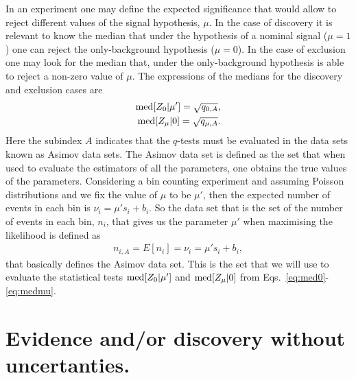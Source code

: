 \documentclass[12pt,a4paper]{article}
\begin{document}
In an experiment one may define the expected significance that would allow to reject different values of the signal hypothesis, $\mu$. In the case of discovery it is relevant to know the median that under the hypothesis of a nominal signal ($\mu=1$) one can reject the only-background hypothesis ($\mu=0$). In the case of exclusion one may look for the median that, under the only-background hypothesis is able to reject a non-zero value of $\mu$. The expressions of the medians for the discovery and exclusion cases are
\begin{align}
{\rm med}[Z_0|\mu']=\sqrt{q_{0,A}},\label{eq:med0}\\
{\rm med}[Z_\mu|0]=\sqrt{q_{\mu,A}}.\label{eq:medmu}
\end{align}
Here the subindex $A$ indicates that the $q$-tests must be evaluated in the data sets known as Asimov data sets. The Asimov data set is defined as the set that when used to evaluate the estimators of all the parameters, one obtains the true values of the parameters. Considering a bin counting experiment and assuming Poisson distributions and we fix the value of $\mu$ to be $\mu'$, then the expected number of events in each bin is $\nu_i=\mu' s_i + b_i$. So the data set that is the set of the number of events in each bin, $n_i$, that gives us the parameter $\mu'$ when maximising the likelihood is defined as
\begin{align}
n_{i,A}=E[n_i]=\nu_i=\mu's_i + b_i,
\label{eq:testasimov}
\end{align}
that basically defines the Asimov data set. This is the set that we will use to evaluate the statistical tests ${\rm med}[Z_0|\mu']$ and ${\rm med}[Z_\mu|0]$ from Eqs.~\eqref{eq:med0}-\eqref{eq:medmu}.
\section{Evidence and/or discovery without uncertanties.}
\end{document}
